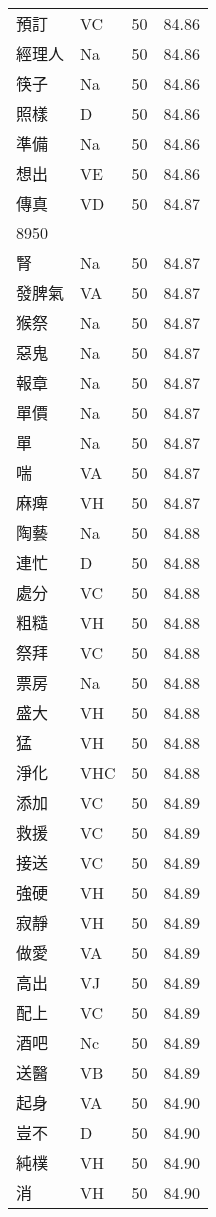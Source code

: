 \documentclass[twocolumn]{book}
\begin{document}
\begin{supertabular}{llrr}
預訂 & VC & 50 &  84.86\\
經理人 & Na & 50 &  84.86\\
筷子 & Na & 50 &  84.86\\
照樣 & D & 50 &  84.86\\
準備 & Na & 50 &  84.86\\
想出 & VE & 50 &  84.86\\
傳真 & VD & 50 &  84.87\\
8950\\
腎 & Na & 50 &  84.87\\
發脾氣 & VA & 50 &  84.87\\
猴祭 & Na & 50 &  84.87\\
惡鬼 & Na & 50 &  84.87\\
報章 & Na & 50 &  84.87\\
單價 & Na & 50 &  84.87\\
單 & Na & 50 &  84.87\\
喘 & VA & 50 &  84.87\\
麻痺 & VH & 50 &  84.87\\
陶藝 & Na & 50 &  84.88\\
連忙 & D & 50 &  84.88\\
處分 & VC & 50 &  84.88\\
粗糙 & VH & 50 &  84.88\\
祭拜 & VC & 50 &  84.88\\
票房 & Na & 50 &  84.88\\
盛大 & VH & 50 &  84.88\\
猛 & VH & 50 &  84.88\\
淨化 & VHC & 50 &  84.88\\
添加 & VC & 50 &  84.89\\
救援 & VC & 50 &  84.89\\
接送 & VC & 50 &  84.89\\
強硬 & VH & 50 &  84.89\\
寂靜 & VH & 50 &  84.89\\
做愛 & VA & 50 &  84.89\\
高出 & VJ & 50 &  84.89\\
配上 & VC & 50 &  84.89\\
酒吧 & Nc & 50 &  84.89\\
送醫 & VB & 50 &  84.89\\
起身 & VA & 50 &  84.90\\
豈不 & D & 50 &  84.90\\
純樸 & VH & 50 &  84.90\\
消 & VH & 50 &  84.90\\

\end{supertabular}
\end{document}
